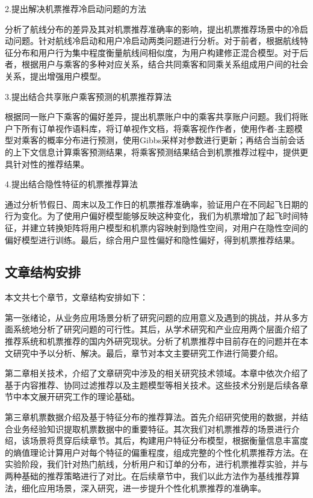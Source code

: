 2.提出解决机票推荐冷启动问题的方法

分析了航线分布的差异及其对机票推荐准确率的影响，提出机票推荐场景中的冷启动问题。针对航线冷启动和用户冷启动两类问题进行分析。对于前者，根据航线特征分布和用户行为集中程度衡量航线间相似度，为用户构建修正混合模型。对于后者，根据用户与乘客的多种对应关系，结合共同乘客和同乘关系组成用户间的社会关系，提出增强用户模型。


3.提出结合共享账户乘客预测的机票推荐算法

根据同一账户下乘客的偏好差异，提出机票账户中的乘客共享账户问题。我们将账户下所有订单视作语料库，将订单视作文档，将乘客视作作者，使用作者-主题模型对乘客的概率分布进行预测，使用Gibbs采样对参数进行更新；再结合当前会话的上下文信息计算乘客预测结果，将乘客预测结果结合到机票推荐过程中，提供更具针对性的推荐结果。

4.提出结合隐性特征的机票推荐算法

通过分析节假日、周末以及工作日的机票推荐准确率，验证用户在不同起飞日期的行为变化。为了使用户偏好模型能够反映这种变化，我们为机票增加了起飞时间特征，并建立转换矩阵将用户模型和机票内容映射到隐性空间，对用户在隐性空间的偏好模型进行训练。最后，综合用户显性偏好和隐性偏好，得到机票推荐结果。


\subsection{文章结构安排}
本文共七个章节，文章结构安排如下：

第一张绪论，从业务应用场景分析了研究问题的应用意义及遇到的挑战，并从多方面系统地分析了研究问题的可行性。其后，从学术研究和产业应用两个层面介绍了推荐系统和机票推荐的国内外研究现状。分析了机票推荐中目前存在的问题并在本文研究中予以分析、解决。最后，章节对本文主要研究工作进行简要介绍。

第二章相关技术，介绍了文章研究中涉及的相关研究技术领域。本章中依次介绍了基于内容推荐、协同过滤推荐以及主题模型等相关技术。这些技术分别是后续各章节中本文展开研究工作的理论基础。

第三章机票数据介绍及基于特征分布的推荐算法。首先介绍研究使用的数据，并结合业务经验知识提取机票数据中的重要特征。其次我们对机票推荐的场景进行介绍，该场景将贯穿后续章节。其后，构建用户特征分布模型，根据衡量信息丰富度的熵值理论计算用户对每个特征的偏重程度，组成完整的个性化机票推荐方法。在实验阶段，我们针对热门航线，分析用户和订单的分布，进行机票推荐实验，并与两种基础的推荐策略进行了对比。在后续章节中，我们以此方法作为基线推荐算法，细化应用场景，深入研究，进一步提升个性化机票推荐的准确率。

